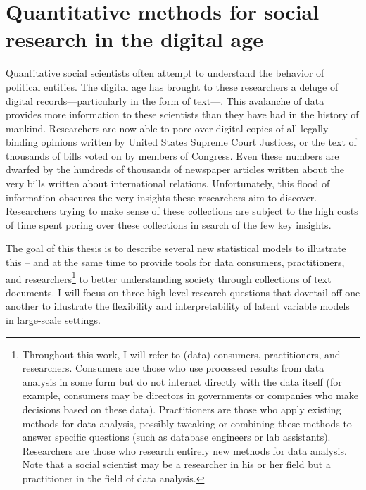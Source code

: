 \chapter{Quantitative methods for social research in the digital age}

Quantitative social scientists often attempt to understand the
behavior of political entities.  The digital age has brought to these
researchers a deluge of digital records---particularly in the form of
text---.  This avalanche of data provides more information to these
scientists than they have had in the history of mankind.  Researchers
are now able to pore over digital copies of all legally binding
opinions written by United States Supreme Court Justices, or the text
of thousands of bills voted on by members of Congress.  Even these
numbers are dwarfed by the hundreds of thousands of newspaper articles
written about the very bills written about international relations.
Unfortunately, this flood of information obscures the very insights
these researchers aim to discover.  Researchers trying to make sense
of these collections are subject to the high costs of time spent
poring over these collections in search of the few key insights.

The goal of this thesis is to describe several new statistical models
to illustrate this -- and at the same time to provide tools for data
consumers, practitioners, and researchers\footnote{Throughout this
  work, I will refer to (data) consumers, practitioners, and
  researchers.  Consumers are those who use processed results from
  data analysis in some form but do not interact directly with the
  data itself (for example, consumers may be directors in governments
  or companies who make decisions based on these data).  Practitioners
  are those who apply existing methods for data analysis, possibly
  tweaking or combining these methods to answer specific questions
  (such as database engineers or lab assistants). Researchers are
  those who research entirely new methods for data analysis.  Note
  that a social scientist may be a researcher in his or her field but
  a practitioner in the field of data analysis.} to better
understanding society through collections of text documents.  I will
focus on three high-level research questions that dovetail off one
another to illustrate the flexibility and interpretability of latent
variable models in large-scale settings.

